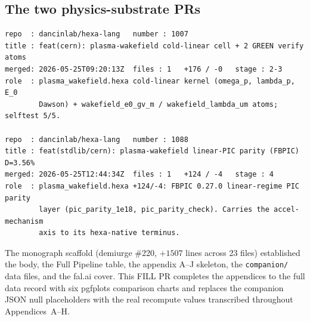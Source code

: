 \subsection{The two physics-substrate PRs}
\label{app:prroll-physics}

\begin{lstlisting}
repo  : dancinlab/hexa-lang   number : 1007
title : feat(cern): plasma-wakefield cold-linear cell + 2 GREEN verify atoms
merged: 2026-05-25T09:20:13Z  files : 1   +176 / -0   stage : 2-3
role  : plasma_wakefield.hexa cold-linear kernel (omega_p, lambda_p, E_0
        Dawson) + wakefield_e0_gv_m / wakefield_lambda_um atoms; selftest 5/5.

repo  : dancinlab/hexa-lang   number : 1088
title : feat(stdlib/cern): plasma-wakefield linear-PIC parity (FBPIC) D=3.56%
merged: 2026-05-25T12:44:34Z  files : 1   +124 / -4   stage : 4
role  : plasma_wakefield.hexa +124/-4: FBPIC 0.27.0 linear-regime PIC parity
        layer (pic_parity_1e18, pic_parity_check). Carries the accel-mechanism
        axis to its hexa-native terminus.
\end{lstlisting}

\noindent
The monograph scaffold (demiurge \#220, $+1507$ lines across 23 files)
established the body, the Full Pipeline table, the appendix A--J skeleton,
the \texttt{companion/} data files, and the fal.ai cover. This FILL PR
completes the appendices to the full data record with six pgfplots
comparison charts and replaces the companion JSON null placeholders with
the real recompute values transcribed throughout Appendices~A--H.
